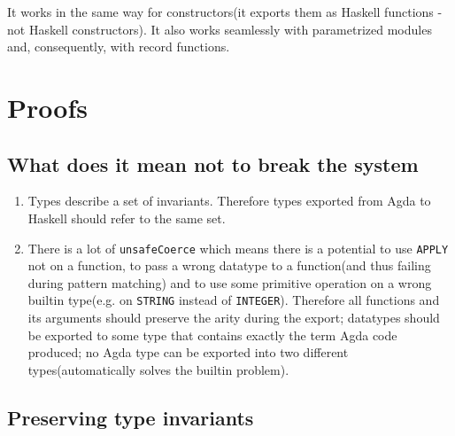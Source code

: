 It works in the same way for constructors(it exports them as Haskell functions - not Haskell constructors).
It also works seamlessly with parametrized modules and, consequently, with record functions.

\section{Proofs}\label{sec:proofs}

\subsection{What does it mean not to break the system}

\begin{enumerate}
\item Types describe a set of invariants. Therefore types exported from Agda to Haskell
      should refer to the same set.
\item There is a lot of \texttt{unsafeCoerce} which means there is a potential to use
      \texttt{APPLY} not on a function, to pass a wrong datatype to a function(and thus failing during
      pattern matching) and to use some primitive operation on
      a wrong builtin type(e.g. on \texttt{STRING} instead of \texttt{INTEGER}).
      Therefore all functions and its arguments should preserve the arity during the export;
      datatypes should be exported to some type that contains exactly the term Agda code produced;
      no Agda type can be exported into two different types(automatically solves the builtin problem).
\end{enumerate}

\subsection{Preserving type invariants}


